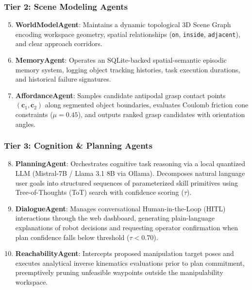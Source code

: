 \documentclass[journal]{IEEEtran}
\begin{document}
\subsubsection{Tier 2: Scene Modeling Agents}
\begin{enumerate}
    \setcounter{enumi}{4}
    \item \textbf{WorldModelAgent}: Maintains a dynamic topological 3D Scene Graph encoding workspace geometry, spatial relationships (\texttt{on}, \texttt{inside}, \texttt{adjacent}), and clear approach corridors.
    \item \textbf{MemoryAgent}: Operates an SQLite-backed spatial-semantic episodic memory system, logging object tracking histories, task execution durations, and historical failure signatures.
    \item \textbf{AffordanceAgent}: Samples candidate antipodal grasp contact points $(\mathbf{c}_1, \mathbf{c}_2)$ along segmented object boundaries, evaluates Coulomb friction cone constraints ($\mu = 0.45$), and outputs ranked grasp candidates with orientation angles.
\end{enumerate}

\subsubsection{Tier 3: Cognition \& Planning Agents}
\begin{enumerate}
    \setcounter{enumi}{7}
    \item \textbf{PlanningAgent}: Orchestrates cognitive task reasoning via a local quantized LLM (Mistral-7B / Llama 3.1 8B via Ollama). Decomposes natural language user goals into structured sequences of parameterized skill primitives using Tree-of-Thoughts (ToT) search with confidence scoring ($\tau$).
    \item \textbf{DialogueAgent}: Manages conversational Human-in-the-Loop (HITL) interactions through the web dashboard, generating plain-language explanations of robot decisions and requesting operator confirmation when plan confidence falls below threshold ($\tau < 0.70$).
    \item \textbf{ReachabilityAgent}: Intercepts proposed manipulation target poses and executes analytical inverse kinematics evaluations prior to plan commitment, preemptively pruning unfeasible waypoints outside the manipulability workspace.
\end{enumerate}
\end{document}

